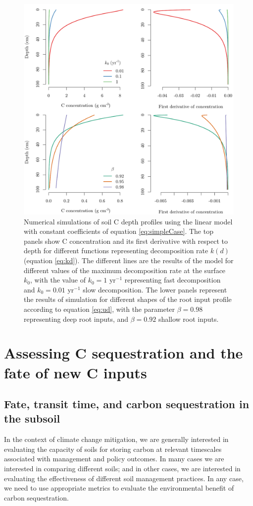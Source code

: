 \documentclass[11pt, oneside, a4paper]{article}   	%
\begin{document}
\begin{figure}[htbp]
   \centering
   \includegraphics[width=\textwidth]{Figures/rootDecomp.pdf} %
%
   \caption{Numerical simulations of soil C depth profiles using the linear model with constant coefficients of equation \ref{eq:simpleCase}. The top panels show C concentration and its first derivative with respect to depth for different functions representing decomposition rate $k(d)$ (equation \ref{eq:kd}). The different lines are the results of the model for different values of the maximum decomposition rate at the surface $k_0$, with the value of $k_0 =1$ yr$^{-1}$ representing fast decomposition and $k_0 = 0.01$ yr$^{-1}$ slow decomposition. The lower panels represent the results of simulation for different shapes of the root input profile according to equation \ref{eq:ud}, with the parameter $\beta = 0.98$ representing deep root inputs, and $\beta = 0.92$ shallow root inputs.}
   \label{fig:rootDecomp}
\end{figure}

\section{Assessing C sequestration and the fate of new C inputs}
\subsection{Fate, transit time, and carbon sequestration in the subsoil}
In the context of climate change mitigation, we are generally interested in evaluating the capacity of soils for storing carbon at relevant timescales associated with management and policy outcomes. In many cases we are interested in comparing different soils; and in other cases, we are interested in evaluating the effectiveness of different soil management practices. In any case, we need to use appropriate metrics to evaluate the environmental benefit of carbon sequestration. 
\end{document}
